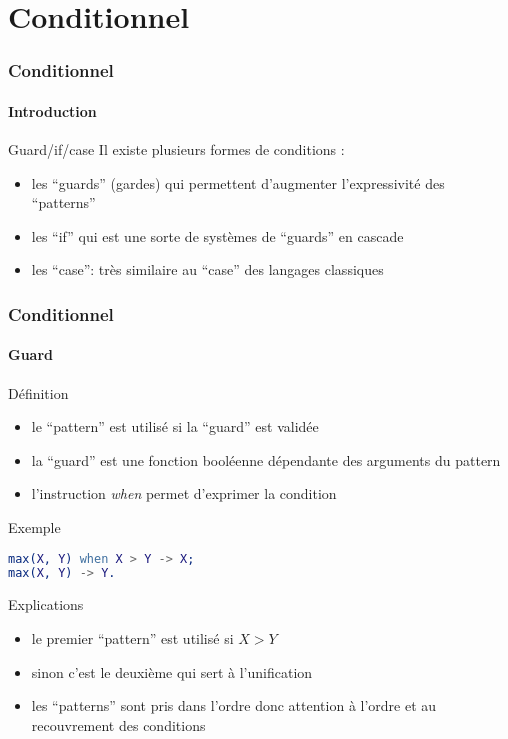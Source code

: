 \section{Conditionnel}

\begin{frame}
  \frametitle{Conditionnel}
  \framesubtitle{Introduction}

  \begin{block}{Guard/if/case}
    Il existe plusieurs formes de conditions :
    \begin{itemize}
    \item les ``guards'' (gardes) qui permettent d'augmenter l'expressivité
      des ``patterns''
    \item les ``if'' qui est une sorte de systèmes de ``guards'' en cascade
    \item les ``case'': très similaire au ``case'' des langages classiques
    \end{itemize}
  \end{block}

\end{frame}

\begin{frame}[fragile]
  \frametitle{Conditionnel}
  \framesubtitle{Guard}

  \begin{block}{Définition}
    \begin{itemize}
    \item le ``pattern'' est utilisé si la ``guard'' est validée
    \item la ``guard'' est une fonction booléenne dépendante des arguments
      du pattern
    \item l'instruction \textit{when} permet d'exprimer la condition
    \end{itemize}
  \end{block}

  \begin{exampleblock}{Exemple}
    \begin{lstlisting}[language=erlang]
max(X, Y) when X > Y -> X;
max(X, Y) -> Y.
    \end{lstlisting}
  \end{exampleblock}

  \begin{alertblock}{Explications}
    \begin{itemize}
    \item le premier ``pattern'' est utilisé si $X > Y$
    \item sinon c'est le deuxième qui sert à l'unification
    \item les ``patterns'' sont pris dans l'ordre donc attention à l'ordre et
      au recouvrement des conditions
    \end{itemize}
  \end{alertblock}

\end{frame}

